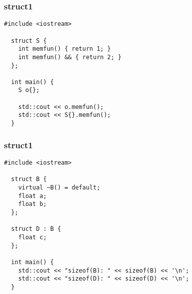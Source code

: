 \begin{frame}[fragile]
  \frametitle{struct1}
  \begin{lstlisting}[language={[11]C++}]
  #include <iostream>

  struct S {
    int memfun() { return 1; }
    int memfun() && { return 2; }
  };

  int main() {
    S o{};

    std::cout << o.memfun();
    std::cout << S{}.memfun();
  }
  \end{lstlisting}
\end{frame}
\begin{frame}[fragile]
  \frametitle{struct1}
  \begin{lstlisting}[language={[11]C++}]
  #include <iostream>

  struct B {
    virtual ~B() = default;
    float a;
    float b;
  };

  struct D : B {
    float c;
  };

  int main() {
    std::cout << "sizeof(B): " << sizeof(B) << '\n';
    std::cout << "sizeof(D): " << sizeof(D) << '\n';
  }
  \end{lstlisting}
\end{frame}
